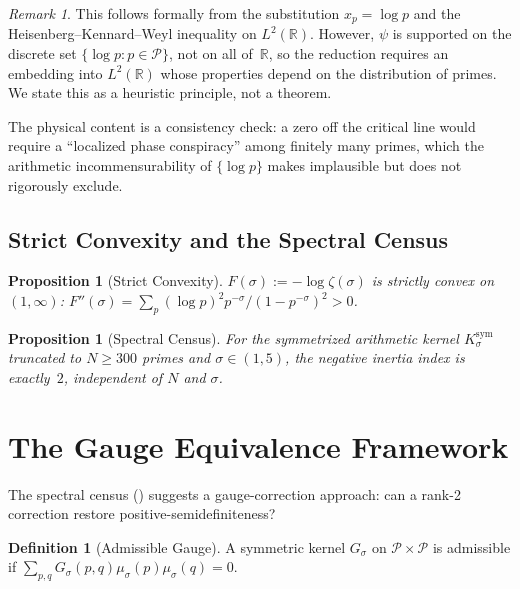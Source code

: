 \documentclass[12pt,a4paper]{article}
\newtheorem{proposition}[theorem]{Proposition}
\theoremstyle{definition}
\newtheorem{definition}[theorem]{Definition}
\theoremstyle{remark}
\newtheorem{remark}[theorem]{Remark}
\newcommand{\Ksym}{K_\sigma^{\mathrm{sym}}}
\newcommand{\muG}{\mu_\sigma}
\newcommand{\PP}{\mathcal{P}}
\begin{document}
\begin{remark}
This follows formally from the substitution $x_p = \log p$ and the Heisenberg--Kennard--Weyl inequality on $L^2(\mathbb{R})$. However, $\psi$ is supported on the discrete set $\{\log p : p \in \PP\}$, not on all of~$\mathbb{R}$, so the reduction requires an embedding into $L^2(\mathbb{R})$ whose properties depend on the distribution of primes. We state this as a heuristic principle, not a theorem.

The physical content is a consistency check: a zero off the critical line would require a ``localized phase conspiracy'' among finitely many primes, which the arithmetic incommensurability of $\{\log p\}$ makes implausible but does not rigorously exclude.
\end{remark}

\subsection{Strict Convexity and the Spectral Census}

\begin{proposition}[Strict Convexity]
\label{prop:convexity}
$F(\sigma) := -\log\zeta(\sigma)$ is strictly convex on $(1,\infty)$: $F''(\sigma) = \sum_p (\log p)^2 p^{-\sigma}/(1-p^{-\sigma})^2 > 0$.
\end{proposition}

\begin{proposition}[Spectral Census]
\label{prop:spectral-census}
For the symmetrized arithmetic kernel $\Ksym$ truncated to $N \geq 300$ primes and $\sigma \in (1, 5)$, the negative inertia index is exactly~$2$, independent of $N$ and $\sigma$.
\end{proposition}


\section{The Gauge Equivalence Framework}
\label{sec:gauge}

The spectral census () suggests a gauge-correction approach: can a rank-2 correction restore positive-semidefiniteness?

\begin{definition}[Admissible Gauge]
A symmetric kernel $G_\sigma$ on $\PP \times \PP$ is admissible if $\sum_{p,q}G_\sigma(p,q)\muG(p)\muG(q) = 0$.
\end{definition}
\end{document}
